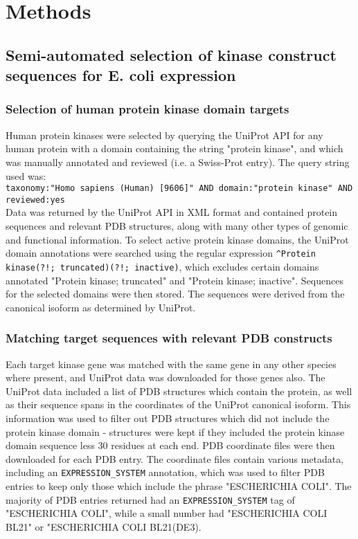 \documentclass[aps,pre,twocolumn,nofootinbib,superscriptaddress,linenumbers]{revtex4-1}
\begin{document}
\section{Methods}
\label{section:methods}

\subsection{Semi-automated selection of kinase construct sequences for E. coli expression}

\subsubsection{Selection of human protein kinase domain targets}

Human protein kinases were selected by querying the UniProt API for any human protein with a domain containing the string "protein kinase", and which was manually annotated and reviewed (i.e. a Swiss-Prot entry).
The query string used was:\\
{\tt taxonomy:"Homo sapiens (Human) [9606]" AND domain:"protein kinase" AND reviewed:yes}\\
Data was returned by the UniProt API in XML format and contained protein sequences and relevant PDB structures, along with many other types of genomic and functional information.
To select active protein kinase domains, the UniProt domain annotations were searched using the regular expression {\tt \^{}Protein kinase(?!; truncated)(?!; inactive)}, which excludes certain domains annotated "Protein kinase; truncated" and "Protein kinase; inactive".
Sequences for the selected domains were then stored.
The sequences were derived from the canonical isoform as determined by UniProt.

\subsubsection{Matching target sequences with relevant PDB constructs}

Each target kinase gene was matched with the same gene in any other species where present, and UniProt data was downloaded for those genes also.
The UniProt data included a list of PDB structures which contain the protein, as well as their sequence spans in the coordinates of the UniProt canonical isoform.
This information was used to filter out PDB structures which did not include the protein kinase domain - structures were kept if they included the protein kinase domain sequence less 30 residues at each end.
PDB coordinate files were then downloaded for each PDB entry.
The coordinate files contain various metadata, including an {\tt EXPRESSION\_SYSTEM} annotation, which was used to filter PDB entries to keep only those which include the phrase "ESCHERICHIA COLI".
The majority of PDB entries returned had an {\tt EXPRESSION\_SYSTEM} tag of "ESCHERICHIA COLI", while a small number had "ESCHERICHIA COLI BL21" or "ESCHERICHIA COLI BL21(DE3).
\end{document}
